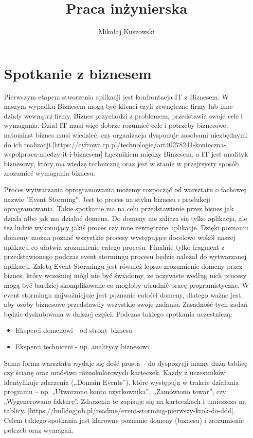 \documentclass{article}
\title{Praca inżynierska}
\author{Mikołaj Kuszowski}
\begin{document}
\maketitle

\section{Spotkanie z biznesem}
      Pierwszym etapem stworzenia aplikacji jest konfrontacja IT z Biznesem. W naszym wypadku Biznesem mogą być klienci czyli zewnętrzne firmy lub inne działy wewnątrz firmy. Biznes przychodzi z problemem, przedstawia swoje cele i wymagania. Dział IT musi więc dobrze rozumieć cele i potrzeby biznesowe, natomiast biznes musi wiedzieć, czy organizacja dysponuje zasobami niezbędnymi do ich realizacji.[https://cyfrowa.rp.pl/technologie/art40278241-konieczna-wspolpraca-miedzy-it-i-biznesem] Łącznikiem między Binzesem, a IT jest analityk biznesowy, który ma wiedzę techniczną oraz jest w stanie w przejrzysty sposób zrozumieć wymagania biznesu.

      Proces wytwarzania oprogramowania możemy rozpocząć od warsztatu o fachowej nazwie "Event Storming". Jest to proces na styku biznesu i produkcji oprogramowania. Takie spotkanie ma na celu przedstawienie przez bisnes jak działa albo jak ma działać domena. Do domeny nie zalicza się tylko aplikacja, ale też ludzie wykonujący jakiś proces czy inne zewnętrzne aplikacje. Dzięki poznaniu domemy można poznać wszystkie procesy występujące docelowo wokół naszej aplikacji co ułatwia zrozumienie całego procesu. Finalnie tylko fragment z przedstawionego podczas event stormingu procesu będzie należał do wytwarzanej aplikacji. Zaletą Event Stormingu jest również lepsze zrozumienie domeny przez biznes, który wcześniej mógł nie być świadomy, że oczywiste według nich procesy mogą być bardziej skomplikowane co mogłoby utrudnić pracę programistyczne. W event stormingu najważniejsze jest poznanie całości domeny, dlatego ważne jest, aby osoby biznesowe przedstawiły wszystkie swoje zadania. Zasadność tych zadań będzie dyskutowana w dalszej części. Podczas takiego spotkania uczestniczą:
      \begin{itemize}
            \item Eksperci domenowi - od strony biznesu
            \item Eksperci techniczni - np. analitycy biznesowi
      \end{itemize}

      Sama forma warsztatu wydaje się dość prosta – do dyspozycji mamy dużą tablicę czy ścianę oraz mnóstwo różnokolorowych karteczek. Każdy z uczestników identyfikuje zdarzenia („Domain Events”), które występują w trakcie działania programu – np. „Utworzono konto użytkownika”, „Zamówiono towar”, czy „Wygenerowano fakturę”. Zdarzenia te zapisuje się na karteczkach i umieszcza na tablicy. [https://bulldogjob.pl/readme/event-storming-pierwszy-krok-do-ddd]. Celem takiego spotkania jest klarowne poznanie domeny (biznesu) i zrozumienie potrzeb oraz wymagań. 
\end{document}
